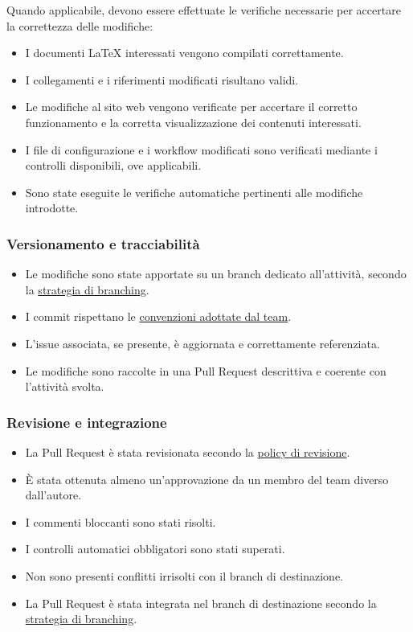 \documentclass[11pt, a4paper]{article}
\begin{document}
Quando applicabile, devono essere effettuate le verifiche necessarie per accertare la correttezza delle modifiche:

\begin{itemize}
    \item I documenti LaTeX interessati vengono compilati correttamente.
    \item I collegamenti e i riferimenti modificati risultano validi.
    \item Le modifiche al sito web vengono verificate per accertare il corretto funzionamento e la corretta visualizzazione dei contenuti interessati.
    \item I file di configurazione e i workflow modificati sono verificati mediante i controlli disponibili, ove applicabili.
    \item Sono state eseguite le verifiche automatiche pertinenti alle modifiche introdotte.
\end{itemize}

\subsubsection{Versionamento e tracciabilità}

\begin{itemize}
    \item Le modifiche sono state apportate su un branch dedicato all'attività, secondo la \hyperref[subsec:creazione-dei-branch]{strategia di branching}.
    \item I commit rispettano le \hyperref[sec:linee-guida-per-i-commit]{convenzioni adottate dal team}.
    \item L'issue associata, se presente, è aggiornata e correttamente referenziata.
    \item Le modifiche sono raccolte in una Pull Request descrittiva e coerente con l'attività svolta.
\end{itemize}

\subsubsection{Revisione e integrazione}

\begin{itemize}
    \item La Pull Request è stata revisionata secondo la \hyperref[subsec:approvazione-e-merge]{policy di revisione}.
    \item È stata ottenuta almeno un'approvazione da un membro del team diverso dall'autore.
    \item I commenti bloccanti sono stati risolti.
    \item I controlli automatici obbligatori sono stati superati.
    \item Non sono presenti conflitti irrisolti con il branch di destinazione.
    \item La Pull Request è stata integrata nel branch di destinazione secondo la \hyperref[sec:strategia-di-branching]{strategia di branching}.
\end{itemize}
\end{document}
